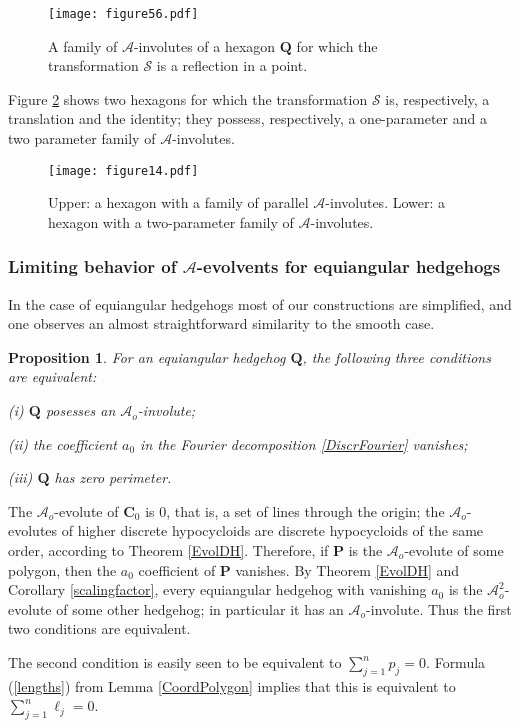 \documentclass[12pt]{article}
\makeatletter
\newtheorem{proposition}[lemma]{Proposition}
\renewenvironment{proof}[1][\proofname] 
{\par\pushQED{\qed}\normalfont\topsep6\p@\@plus6\p@\relax\trivlist\item[\hskip\labelsep\bfseries#1\@addpunct{.}]\ignorespaces}{\popQED\endtrivlist\@endpefalse}
\newcommand{\Aev}{\mathcal{A}}
\newcommand{\Aeo}{\mathcal{A}_o}
\renewcommand{\P}{\mathbf{P}}
\makeatother
\begin{document}
\begin{figure}[hbtp]
\centering
\texttt{[image: figure56.pdf]}
\caption{A family of $\Aev$-involutes of a hexagon $\mathbf Q$ for which the transformation $\mathcal S$ is a reflection in a point.}
\label{hexaginvoltwo}
\end{figure}

Figure \ref{hexaginvolthree} shows two hexagons for which the transformation $\mathcal S$ is, respectively, a translation and the identity; they possess, respectively, a one-parameter and a two parameter family of $\Aev$-involutes.

\begin{figure}[hbtp]
\centering
\texttt{[image: figure14.pdf]}
\caption{Upper: a hexagon with a family of parallel $\Aev$-involutes. Lower: a hexagon with a two-parameter family of $\Aev$-involutes.}
\label{hexaginvolthree}
\end{figure}

\subsubsection{Limiting behavior of $\Aev$-evolvents for equiangular hedgehogs}

In the case of equiangular hedgehogs most of our constructions are simplified, and one observes an almost  straightforward similarity to the smooth case. 

\begin{proposition}
\label{WhenInvol}
For an equiangular hedgehog $\mathbf Q$, the following three conditions are equivalent:

{\rm (i)} $\mathbf Q$ posesses an $\Aeo$-involute;

{\rm (ii)}  the coefficient $a_0$ in the Fourier decomposition \eqref{DiscrFourier} vanishes;

{\rm (iii)} $\mathbf Q$ has zero perimeter.
\end{proposition}
\begin{proof}
The $\Aeo$-evolute of $\mathbf{C}_0$ is $0$, that is, a set of lines through the origin; the $\Aeo$-evolutes of higher discrete hypocycloids are discrete hypocycloids of the same order, according to Theorem \ref{EvolDH}. Therefore, if $\P$ is the $\Aeo$-evolute of some polygon, then the $a_0$ coefficient of $\P$ vanishes. By Theorem \ref{EvolDH} and Corollary \ref{scalingfactor}, every equiangular hedgehog with vanishing $a_0$ is the $\Aeo^2$-evolute of some other hedgehog; in particular it has an $\Aeo$-involute. Thus the first two conditions are equivalent.
	
The second condition is easily seen to be equivalent to $\sum_{j=1}^n p_j = 0$. Formula (\ref{lengths}) from Lemma \ref{CoordPolygon} implies that this is equivalent to $\sum_{j=1}^n \ell_j = 0$.
\end{proof}
\end{document}
